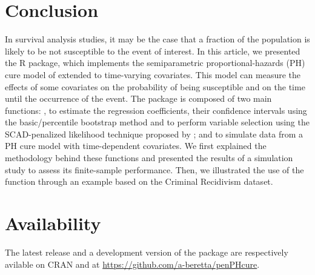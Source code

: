 \section{Conclusion}

In survival analysis studies, it may be the case that a fraction of the population is likely to be not susceptible to the event of interest.
In this article, we presented the  R package, which implements the semiparametric proportional-hazards (PH) cure model of \citet{Sy_Taylor_2000} extended to time-varying covariates. 
This model can measure the effects of some covariates on the probability of being susceptible and on the time until the occurrence of the event.
The  package is composed of two main functions: , to estimate the regression coefficients, their confidence intervals using the basic/percentile bootstrap method and to perform variable selection using the SCAD-penalized likelihood technique proposed by \citet{Beretta_Heuchenne_2019}; and  to simulate data from a PH cure model with time-dependent covariates.
We first explained the methodology behind these functions and presented the results of a simulation study to assess its finite-sample performance.
Then, we illustrated the use of the  function through an example based on the Criminal Recidivism dataset.



\section{Availability}

The latest release and a development version of the  package are respectively avilable on CRAN and at \url{https://github.com/a-beretta/penPHcure}. 




\address{Alessandro Beretta\\
  Centre for Quantitative Methods and Operations Management (QuantOM)\\
  HEC Li\`ege\\
  Rue Louvrex, 14 - 4000 Li\`ege\\
  Belgium\\
  }

\address{C\'edric Heuchenne\\
  Centre for Quantitative Methods and Operations Management (QuantOM)\\
  HEC Li\`ege\\
  Rue Louvrex, 14 - 4000 Li\`ege\\
  Belgium\\
  }

